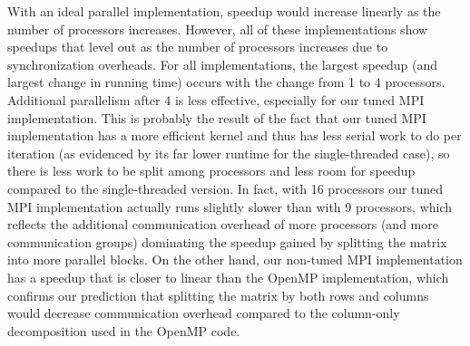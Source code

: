 \documentclass[11pt]{article}
\begin{document}
With an ideal parallel implementation, speedup would increase linearly as the number of processors increases.
However, all of these implementations show speedups that level out as the number of processors increases due to synchronization overheads.
For all implementations, the largest speedup (and largest change in running time) occurs with the change from 1 to 4 processors.
Additional parallelism after 4 is less effective, especially for our tuned MPI implementation.
This is probably the result of the fact that our tuned MPI implementation has a more efficient kernel and thus has less serial work to do per iteration (as evidenced by its far lower runtime for the single-threaded case), so there is less work to be split among processors and less room for speedup compared to the single-threaded version.
In fact, with 16 processors our tuned MPI implementation actually runs slightly slower than with 9 processors, which reflects the additional communication overhead of more processors (and more communication groups) dominating the speedup gained by splitting the matrix into more parallel blocks.
On the other hand, our non-tuned MPI implementation has a speedup that is closer to linear than the OpenMP implementation, which confirms our prediction that splitting the matrix by both rows and columns would decrease communication overhead compared to the column-only decomposition used in the OpenMP code.
\end{document}
